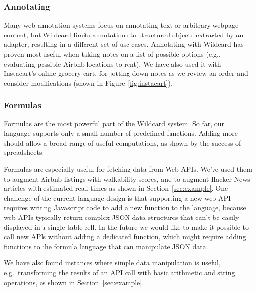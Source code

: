 \documentclass[sigplan,screen,10pt,anonymous,review]{acmart}
\begin{document}
\hypertarget{annotating}{%
\subsubsection{Annotating}\label{annotating}}

Many web annotation systems focus on annotating text or arbitrary
webpage content, but Wildcard limits annotations to structured objects
extracted by an adapter, resulting in a different set of use cases.
Annotating with Wildcard has proven most useful when taking notes on a
list of possible options (e.g., evaluating possible Airbnb locations to
rent). We have also used it with Instacart's online grocery cart, for
jotting down notes as we review an order and consider modifications
(shown in Figure~\ref{fig:instacart}).

\hypertarget{formulas}{%
\subsubsection{Formulas}\label{formulas}}

Formulas are the most powerful part of the Wildcard system. So far, our
language supports only a small number of predefined functions. Adding
more should allow a broad range of useful computations, as shown by the
success of spreadsheets.

Formulas are especially useful for fetching data from Web APIs. We've
used them to augment Airbnb listings with walkability scores, and to
augment Hacker News articles with estimated read times as shown in
Section~\ref{sec:example}. One challenge of the current language design
is that supporting a new web API requires writing Javascript code to add
a new function to the language, because web APIs typically return
complex JSON data structures that can't be easily displayed in a single
table cell. In the future we would like to make it possible to call new
APIs without adding a dedicated function, which might require adding
functions to the formula language that can manipulate JSON data.

We have also found instances where simple data manipulation is useful,
e.g.~transforming the results of an API call with basic arithmetic and
string operations, as shown in Section~\ref{sec:example}.
\end{document}
